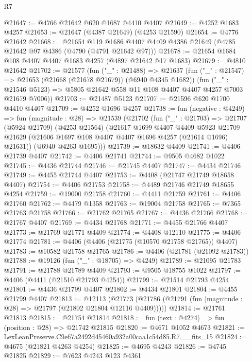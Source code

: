 \begin{lexlean}{R7}
\begin{coremodule}
@21647 := @4766 @21642 @620 @1687 @4410 @4407
@21649 := @4252 @1683 @4257
@21653 := @21647 (@4387 @21649) (@4253 @21590)
@21654 := @4776 @21642
@21668 := @21654
    @119
    @1686
    @4407
    @4409
    @4386
    @21649
    (@4785 @21642 @97 @4386 (@4790 (@4791 @21642 @97)))
@21678 := @21654 @1684 @108 @4407 @4407 @1683 @4257 (@4897 @21642 @17 @1683)
@21679 := @4810 @21642
@21702 := @21577
    (fun ("_" : @21488) =>
    @21637
      (fun ("_" : @21547) => @21653 (@21668 (@21678 @21679)) (@6940 @4345 @1682))
      (fun ("_" : @21546 @5123) => @5805 @21642 @558 @11 @108 @4407 @4407 @4257 @7003 @21679 @7006))
@21703 := @21487 @5123
@21707 := @21596 @620 @1700 @4410 @4407
@21709 := @4252 @1696 @4257
@21738 := fun (negative : @4249) =>
  fun (magnitude : @28) =>
  @21539
    (@21702
      (fun ("_" : @21703) =>
      @21707
        (@5924 @21709)
        (@4253 @21564)
        (@21617
          @1699
          @4407
          @4409
          @5923
          @21709
          @21629
          (@21606 @1697 @108 @4407 @4407 @1696 @4257 (@21614 @1696) @21631))
        (@6940 @4263 @1695)))
@21739 := @18632 @4409
@21741 := @4406 @21739 @4407
@21742 := @4406 @21741
@21744 := @9505 @4682 @1022
@21745 := @4436 @21744
@21746 := @21745 @4407
@21747 := @4434 @21746
@21749 := @4455 @21744 @4407
@21753 := @4408 (@21747 @21749 @18658 @4407)
@21754 := @4406 @21753
@21758 := @4489 @21746 @21749 @18655 @4254
@21759 := @19000 @21758
@21760 := @4411 @21759
@21761 := @4406 @21760
@21762 := @4479 @1358
@21763 := @19004 @21758
@21765 := @7365 @21763 @21758
@21766 := @21762 @21765
@21767 := @4436 @21766
@21768 := @21767 @4407
@21769 := @4434 @21768
@21771 := @4455 @21766 @4407
@21773 := @21769 @21771 @4409
@21774 := @4408 @12110
@21775 := @4406 @21774
@21781 := @4406 (@4406 (@21775 (@10570 @21758 @21765)) @4407)
@21783 := @10582 @21758 @21765
@21786 := @4406 (@21781 (@21092 @21783))
@21788 := @19126 (fun ("_" : @18705) => @4249)
@21789 := @21095 @21783
@21791 := @21788 @21789 @4409
@21793 := @9505 @18755 @1022
@21797 := @4406 (@4411 (@21510 @21793 @4254))
@21799 := @21514 @21793 @4254
@21801 := @4436 @21799 @4407
@21802 := @4434 @21801
@21804 := @4455 @21799 @4407
@21813 := @12113
    (@21773 (@21786 (@21791 (fun (magnitude : @28) => @21797 (@21802 @21804 @12116 @4409)))))
@21814 := @21761 @21813
@21815 := @21754 @21814
@21818 := fun (text : @4274) => fun (position : @28) => @21742 @21815
@21820 := @4671 @1052 @4673
@21821 := LexLeanPreserve.C9e67a2492d45460a932a00caa1c54d85.R7.__fits_15
@21824 := @4675 (@21821 @4263 @4254)
@21825 := @4695 @4243
@21826 := @4745 @21825
@21829 := @7623 @4243 @123 @4361

\end{coremodule}
\end{lexlean}
